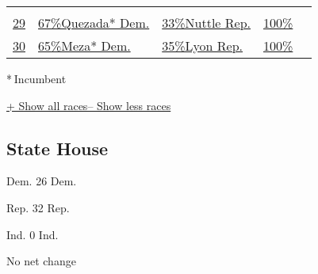 \begin{longtable}[]{@{}lllll@{}}
&
\href{//www.nytimes.com/elections/2016/results/arizona-state-senate-district-28}{}\tabularnewline
\href{//www.nytimes.com/elections/2016/results/arizona-state-senate-district-29}{29}
&
\href{//www.nytimes.com/elections/2016/results/arizona-state-senate-district-29}{
67\%Quezada* Dem.} &
\href{//www.nytimes.com/elections/2016/results/arizona-state-senate-district-29}{
33\%Nuttle Rep.} &
\href{//www.nytimes.com/elections/2016/results/arizona-state-senate-district-29}{100\%}
&
\href{//www.nytimes.com/elections/2016/results/arizona-state-senate-district-29}{}\tabularnewline
\href{//www.nytimes.com/elections/2016/results/arizona-state-senate-district-30}{30}
&
\href{//www.nytimes.com/elections/2016/results/arizona-state-senate-district-30}{
65\%Meza* Dem.} &
\href{//www.nytimes.com/elections/2016/results/arizona-state-senate-district-30}{
35\%Lyon Rep.} &
\href{//www.nytimes.com/elections/2016/results/arizona-state-senate-district-30}{100\%}
&
\href{//www.nytimes.com/elections/2016/results/arizona-state-senate-district-30}{}\tabularnewline
\bottomrule
\end{longtable}

* Incumbent~

\protect\hyperlink{}{+ Show all races-- Show less races}

\hypertarget{state-house}{%
\subsection{State House}\label{state-house}}

Dem. 26 Dem.

Rep. 32 Rep.

Ind. 0 Ind.

No net change

